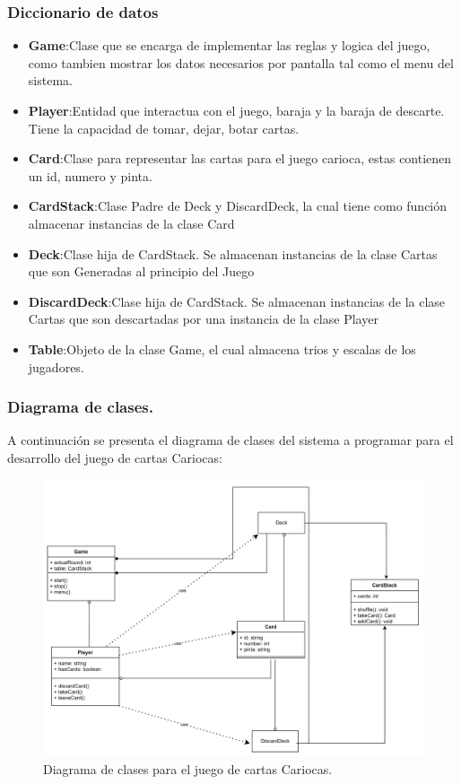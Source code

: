 \documentclass[60pt]{article}
\begin{document}
\subsubsection{Diccionario de datos}\label{cap:diccionario-datos}
\begin{itemize}
    \item\textbf{Game}:Clase que se encarga de implementar las reglas y logica del juego, \\como tambien mostrar los datos necesarios por pantalla tal como el menu del sistema. 
    \item\textbf{Player}:Entidad que interactua con el juego, baraja y la baraja de descarte. Tiene la capacidad de tomar, dejar, botar cartas.
    \item\textbf{Card}:Clase para representar las cartas para el juego carioca, estas contienen un id, numero y pinta.
    \item\textbf{CardStack}:Clase Padre de Deck y DiscardDeck, la cual tiene como función almacenar instancias de la clase Card
    \item\textbf{Deck}:Clase hija de CardStack. Se almacenan instancias de la clase Cartas que son Generadas al principio del Juego
    \item\textbf{DiscardDeck}:Clase hija de CardStack. Se almacenan instancias de la clase Cartas que son descartadas por una instancia de la clase Player
    \item\textbf{Table}:Objeto de la clase Game, el cual almacena trios y escalas de los jugadores. 
\end{itemize}
\clearpage
\subsubsection{Diagrama de clases.}\label{cap:diagrama-clases}
A continuación se presenta el diagrama de clases del sistema a programar para el desarrollo del juego de cartas Cariocas:
\begin{figure}[H]
    \centering
    \includegraphics[width=15cm]{diclass.png}
    \caption{Diagrama de clases para el juego de cartas Cariocas.}
\end{figure}
\end{document}
